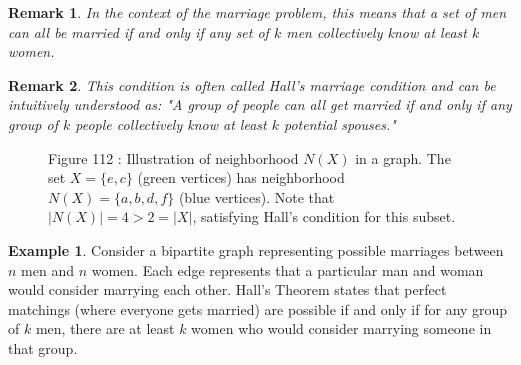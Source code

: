 \documentclass{article}
\newtheorem{remark}{Remark}
\theoremstyle{definition}
\newtheorem{example}{Example}
\begin{document}
\begin{remark}
In the context of the marriage problem, this means that a set of men can all be married if and only if any set of $k$ men collectively know at least $k$ women.
\end{remark}

\begin{remark}
This condition is often called \emph{Hall's marriage condition} and can be intuitively understood as: "A group of people can all get married if and only if any group of $k$ people collectively know at least $k$ potential spouses."
\end{remark}

\begin{figure}[h]
\centering
{}

\small Figure 112 : {Illustration of neighborhood $N(X)$ in a graph. The set $X = \{e, c\}$ (green vertices) has neighborhood $N(X) = \{a, b, d, f\}$ (blue vertices). Note that $|N(X)| = 4 > 2 = |X|$, satisfying Hall's condition for this subset.}
\end{figure}

\begin{example}
Consider a bipartite graph representing possible marriages between $n$ men and $n$ women. Each edge represents that a particular man and woman would consider marrying each other. Hall's Theorem states that perfect matchings (where everyone gets married) are possible if and only if for any group of $k$ men, there are at least $k$ women who would consider marrying someone in that group.
\end{example}
\end{document}
